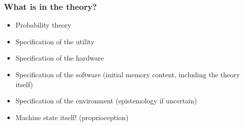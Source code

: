 \documentclass[aspectratio=169]{beamer}
\begin{document}
\begin{frame}
  \frametitle{What is in the theory?}
  \begin{itemize}
  \item Probability theory
  \item Specification of the utility
  \item Specification of the hardware
  \item Specification of the software (initial memory content,
    including the theory itself)
  \item Specification of the environment ({\color{red}epistemology} if uncertain)
  \item {\color{red}Machine state itself!} (proprioception)
  \end{itemize}
\end{frame}
\end{document}
